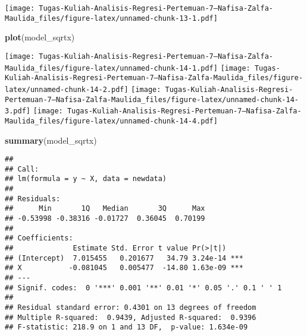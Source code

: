 \documentclass[
]{article}
\newenvironment{Shaded}{\begin{snugshade}}{\end{snugshade}}
\newcommand{\AttributeTok}[1]{\textcolor[rgb]{0.13,0.29,0.53}{#1}}
\newcommand{\FunctionTok}[1]{\textcolor[rgb]{0.13,0.29,0.53}{\textbf{#1}}}
\newcommand{\NormalTok}[1]{#1}
\newcommand{\OtherTok}[1]{\textcolor[rgb]{0.56,0.35,0.01}{#1}}
\newcommand{\SpecialCharTok}[1]{\textcolor[rgb]{0.81,0.36,0.00}{\textbf{#1}}}
\begin{document}
\begin{Shaded}
\end{Shaded}

\texttt{[image: Tugas-Kuliah-Analisis-Regresi-Pertemuan-7---Nafisa-Zalfa-Maulida\_files/figure-latex/unnamed-chunk-13-1.pdf]}

\begin{Shaded}
\begin{Highlighting}[]
\FunctionTok{plot}\NormalTok{(model\_sqrtx)}
\end{Highlighting}
\end{Shaded}

\texttt{[image: Tugas-Kuliah-Analisis-Regresi-Pertemuan-7---Nafisa-Zalfa-Maulida\_files/figure-latex/unnamed-chunk-14-1.pdf]}
\texttt{[image: Tugas-Kuliah-Analisis-Regresi-Pertemuan-7---Nafisa-Zalfa-Maulida\_files/figure-latex/unnamed-chunk-14-2.pdf]}
\texttt{[image: Tugas-Kuliah-Analisis-Regresi-Pertemuan-7---Nafisa-Zalfa-Maulida\_files/figure-latex/unnamed-chunk-14-3.pdf]}
\texttt{[image: Tugas-Kuliah-Analisis-Regresi-Pertemuan-7---Nafisa-Zalfa-Maulida\_files/figure-latex/unnamed-chunk-14-4.pdf]}

\begin{Shaded}
\begin{Highlighting}[]
\FunctionTok{summary}\NormalTok{(model\_sqrtx)}
\end{Highlighting}
\end{Shaded}

\begin{verbatim}
## 
## Call:
## lm(formula = y ~ X, data = newdata)
## 
## Residuals:
##      Min       1Q   Median       3Q      Max 
## -0.53998 -0.38316 -0.01727  0.36045  0.70199 
## 
## Coefficients:
##              Estimate Std. Error t value Pr(>|t|)    
## (Intercept)  7.015455   0.201677   34.79 3.24e-14 ***
## X           -0.081045   0.005477  -14.80 1.63e-09 ***
## ---
## Signif. codes:  0 '***' 0.001 '**' 0.01 '*' 0.05 '.' 0.1 ' ' 1
## 
## Residual standard error: 0.4301 on 13 degrees of freedom
## Multiple R-squared:  0.9439, Adjusted R-squared:  0.9396 
## F-statistic: 218.9 on 1 and 13 DF,  p-value: 1.634e-09
\end{verbatim}
\end{document}
